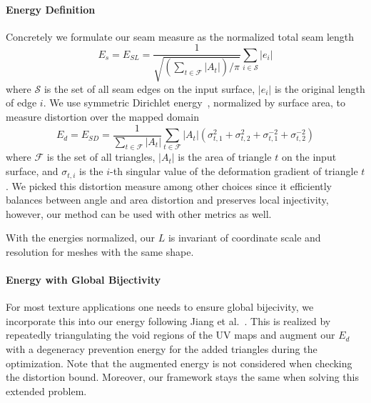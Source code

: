 \paragraph{Energy Definition}
Concretely we formulate our seam measure as the normalized total seam length
\[ E_s = E_{SL} = \frac{1}{\sqrt{(\sum_{t\in\mathcal{F}} |A_t|)/\pi}} \sum_{i \in \mathcal{S}} |e_i| \]
where $\mathcal{S}$ is the set of all seam edges on the input surface, $|e_i|$ is the original length of edge $i$.
We use symmetric Dirichlet energy~\cite{Smith2015Bijective}, normalized by surface area, to measure distortion over the mapped domain
\[ E_d = E_{SD} = \frac{1}{\sum_{t\in\mathcal{F}} |A_t|} \sum_{t\in\mathcal{F}} |A_t|(\sigma_{t,1}^2 + \sigma_{t,2}^2 + \sigma_{t,1}^{-2} + \sigma_{t,2}^{-2}) \]
where $\mathcal{F}$ is the set of all triangles, $|A_t|$ is the area of triangle $t$ on the input surface, and $\sigma_{t,i}$ is the $i$-th singular value of the deformation gradient of triangle $t$.
We picked this distortion measure among other choices since it efficiently balances between angle and area distortion and preserves local injectivity, however, our method can be used with other metrics as well.

With the energies normalized, our $L$ is invariant of coordinate scale and resolution for meshes with the same shape.


\paragraph{Energy with Global Bijectivity}
For most texture applications one needs to ensure global bijecivity, we incorporate this into our energy following Jiang et al.~. This is realized by repeatedly triangulating the void regions of the UV maps and augment our $E_d$ with a degeneracy prevention energy for the added triangles during the optimization. Note that the augmented energy is not considered when checking the distortion bound. Moreover, our framework stays the same when solving this extended problem.





